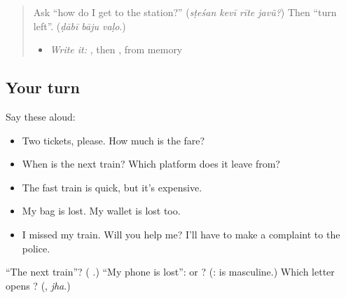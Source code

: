\label{lesson:GU-R280-at-the-station}



\begin{quote}
Ask \textquotedblleft{}how do I get to the station?\textquotedblright{} (\emph{sṭeśan kevī rīte javũ?}) Then \textquotedblleft{}turn left\textquotedblright{}. (\emph{ḍābī bāju vaḷo}.)

\begin{itemize}
\raggedright
  \item \emph{Write it:} \textbf{}, then \textbf{}, from memory
\end{itemize}
\end{quote}

\subsection*{Your turn}
Say these aloud:

\begin{itemize}
\raggedright
  \item Two tickets, please. How much is the fare?
  \item When is the next train? Which platform does it leave from?
  \item The fast train is quick, but it's expensive.
  \item My bag is lost. My wallet is lost too.
  \item I missed my train. Will you help me? I'll have to make a complaint to the police.
\end{itemize}

\begin{tcolorbox}[breakable,colback=teal!4,colframe=teal!35!black,title={Before you move on}]
\textquotedblleft{}The next train\textquotedblright{}? (\textbf{ }.) \textquotedblleft{}My phone is lost\textquotedblright{}: \textbf{} or \textbf{}? (\textbf{}: \textbf{} is masculine.) Which letter opens \textbf{}? (\textbf{}, \emph{jha}.)
\end{tcolorbox}
